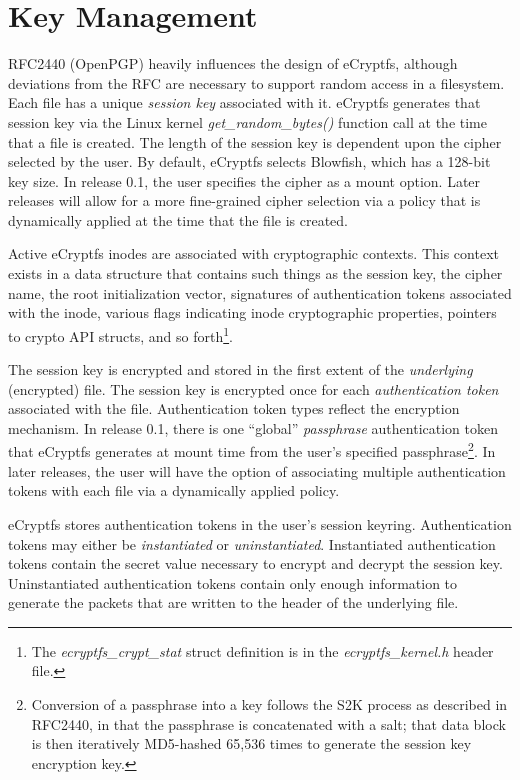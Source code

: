 \documentclass{article}
\begin{document}
\section*{Key Management}

RFC2440 (OpenPGP) heavily influences the design of eCryptfs, although
deviations from the RFC are necessary to support random access in a
filesystem. Each file has a unique \emph{session key} associated with
it. eCryptfs generates that session key via the Linux kernel
\emph{get\_random\_bytes()} function call at the time that a file is
created. The length of the session key is dependent upon the cipher
selected by the user. By default, eCryptfs selects Blowfish, which has
a 128-bit key size. In release 0.1, the user specifies the cipher as a
mount option. Later releases will allow for a more fine-grained cipher
selection via a policy that is dynamically applied at the time that
the file is created.

Active eCryptfs inodes are associated with cryptographic
contexts. This context exists in a data structure that contains such
things as the session key, the cipher name, the root initialization
vector, signatures of authentication tokens associated with the inode,
various flags indicating inode cryptographic properties, pointers to
crypto API structs, and so forth\footnote{The
\emph{ecryptfs\_crypt\_stat} struct definition is in the
\emph{ecryptfs\_kernel.h} header file.}.

The session key is encrypted and stored in the first extent of the
\emph{underlying} (encrypted) file. The session key is encrypted once
for each \emph{authentication token} associated with the
file. Authentication token types reflect the encryption mechanism. In
release 0.1, there is one ``global'' \emph{passphrase} authentication
token that eCryptfs generates at mount time from the user's specified
passphrase\footnote{Conversion of a passphrase into a key follows the
S2K process as described in RFC2440, in that the passphrase is
concatenated with a salt; that data block is then iteratively
MD5-hashed 65,536 times to generate the session key encryption
key.}. In later releases, the user will have the option of associating
multiple authentication tokens with each file via a dynamically
applied policy.

eCryptfs stores authentication tokens in the user's session
keyring. Authentication tokens may either be \emph{instantiated} or
\emph{uninstantiated}. Instantiated authentication tokens contain the
secret value necessary to encrypt and decrypt the session
key. Uninstantiated authentication tokens contain only enough
information to generate the packets that are written to the header of
the underlying file.
\end{document}
